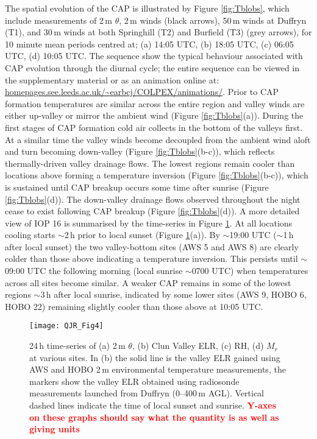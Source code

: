 \documentclass[times]{qjrms4}
\begin{document}
The spatial evolution of the CAP is illustrated by Figure \ref{fig:Tblobs}, which include measurements of 2$\,\mbox{m}$ $\theta$, 2$\,\mbox{m}$ winds (black arrows), 50$\,\mbox{m}$ winds at Duffryn (T1), and 30$\,\mbox{m}$ winds at both Springhill (T2) and Burfield (T3) (grey arrows), for 10 minute mean periods centred at; (a) 14:05 UTC, (b) 18:05 UTC, (c) 06:05 UTC, (d) 10:05 UTC. The sequence show the typical behaviour associated with CAP evolution through the diurnal cycle; the entire sequence can be viewed in the supplementary material or as an animation online at: \url{homepages.see.leeds.ac.uk/~earbcj/COLPEX/animations/}. Prior to CAP formation temperatures are similar across the entire region and valley winds are either up-valley or mirror the ambient wind (Figure \ref{fig:Tblobs}(a)). During the first stages of CAP formation cold air collects in the bottom of the valleys first. At a similar time the valley winds become decoupled from the ambient wind aloft and turn becoming down-valley (Figure \ref{fig:Tblobs}(b-c)), which reflects thermally-driven valley drainage flows. The lowest regions remain cooler than locations above forming a temperature inversion (Figure \ref{fig:Tblobs}(b-c)), which is sustained until CAP breakup occurs some time after sunrise (Figure \ref{fig:Tblobs}(d)). The down-valley drainage flows observed throughout the night cease to exist following CAP breakup (Figure \ref{fig:Tblobs}(d)). A more detailed view of IOP 16 is summarised by the time-series in Figure \ref{fig:tseries}. At all locations cooling starts $\sim$2$\,\mbox{h}$ prior to local sunset (Figure \ref{fig:tseries}(a)). By $\sim$19:00 UTC ($\sim$1$\,\mbox{h}$ after local sunset) the two valley-bottom sites (AWS 5 and AWS 8) are clearly colder than those above indicating a temperature inversion. This persists until $\sim$09:00 UTC the following morning (local sunrise $\sim$0700 UTC) when temperatures across all sites become similar. A weaker CAP remains in some of the lowest regions $\sim$3$\,\mbox{h}$ after local sunrise, indicated by some lower sites (AWS 9, HOBO 6, HOBO 22) remaining slightly cooler than those above at 10:05 UTC.
        \begin{figure}
        \centering
        \texttt{[image: QJR\_Fig4]}
        \caption{24$\,\mbox{h}$ time-series of (a) 2$\,\mbox{m}$ $\theta$, (b) Clun Valley ELR, (c) RH, (d) $M_r$ at various sites. In (b) the solid line is the valley ELR gained using AWS and HOBO 2$\,\mbox{m}$ environmental temperature measurements, the markers show the valley ELR obtained using radiosonde measurements launched from Duffryn (0--400$\,\mbox{m}$ AGL). Vertical dashed lines indicate the time of local sunset and sunrise. \textcolor{red}{\bf Y-axes on these graphs should say what the quantity is as well as giving units}}
        \label{fig:tseries}
        \end{figure}
\end{document}
